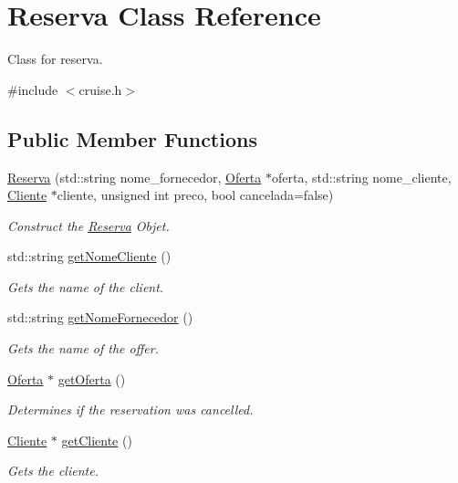 \hypertarget{classReserva}{}\section{Reserva Class Reference}
\label{classReserva}


Class for reserva.  




{\ttfamily \#include $<$cruise.\+h$>$}

\subsection*{Public Member Functions}
\begin{DoxyCompactItemize}
\item 
\hyperlink{classReserva_a96145a1381e9a9e5bb2091bb17e1d496}{Reserva} (std\+::string nome\+\_\+fornecedor, \hyperlink{classOferta}{Oferta} $\ast$oferta, std\+::string nome\+\_\+cliente, \hyperlink{classCliente}{Cliente} $\ast$cliente, unsigned int preco, bool cancelada=false)
\begin{DoxyCompactList}\small\item\em Construct the \hyperlink{classReserva}{Reserva} Objet. \end{DoxyCompactList}\item 
std\+::string \hyperlink{classReserva_a87b0465c8e9d2291d5dddd48fce24c38}{get\+Nome\+Cliente} ()
\begin{DoxyCompactList}\small\item\em Gets the name of the client. \end{DoxyCompactList}\item 
std\+::string \hyperlink{classReserva_ad54ef5f67fa096e711d2ab526db30bf3}{get\+Nome\+Fornecedor} ()
\begin{DoxyCompactList}\small\item\em Gets the name of the offer. \end{DoxyCompactList}\item 
\hyperlink{classOferta}{Oferta} $\ast$ \hyperlink{classReserva_ac7fb69d14f442f58961bd337267bd92d}{get\+Oferta} ()
\begin{DoxyCompactList}\small\item\em Determines if the reservation was cancelled. \end{DoxyCompactList}\item 
\hyperlink{classCliente}{Cliente} $\ast$ \hyperlink{classReserva_a3b8ef1c42c35aabcc2bdde4767b4bace}{get\+Cliente} ()
\begin{DoxyCompactList}\small\item\em Gets the cliente. \end{DoxyCompactList}\item 

\end{DoxyCompactItemize}
